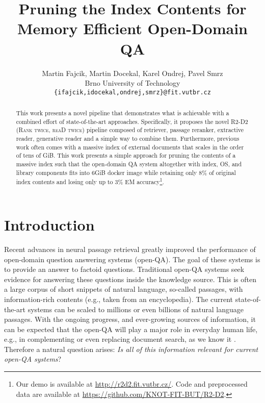 \documentclass[11pt,a4paper]{article}
\title{Pruning the Index Contents for Memory Efficient Open-Domain QA}
\author{Martin Fajcik, Martin Docekal, Karel Ondrej, Pavel Smrz\\
  Brno University of Technology\\
{\tt \{ifajcik,idocekal,ondrej,smrz\}@fit.vutbr.cz} }
\date{}
\begin{document}
\maketitle

\begin{abstract}
This work presents a novel pipeline that demonstrates what is achievable with a combined effort of state-of-the-art approaches. Specifically, it proposes the novel R2-D2 (\textsc{Rank twice}, \textsc{reaD twice}) pipeline composed of retriever, passage reranker, extractive reader, generative reader and a simple way to combine them.
Furthermore, previous work often comes with a massive index of external documents that scales in the order of tens of GiB. 
    This work presents a simple approach for pruning the contents of a massive index such that the open-domain QA system altogether with index, OS, and library components fits into 6GiB docker image while retaining only 8\% of original index contents and losing only up to 3\% EM accuracy\footnote{Our demo is available at \url{http://r2d2.fit.vutbr.cz/}. Code and preprocessed data are available at \url{https://github.com/KNOT-FIT-BUT/R2-D2}.}.
\end{abstract}





\section{Introduction}
Recent advances in neural passage retrieval \cite[\textit{inter alia}]{karpukhin2020dense, izacard2020distilling, khattab2020relevance, luan2020sparse} greatly improved the performance of open-domain question answering systems (open-QA). 
The goal of these systems is to provide an answer to factoid questions. 
Traditional open-QA systems \cite{chen2017reading} seek evidence for answering these questions inside the knowledge source. 
This is often a large corpus of short snippets of natural language, so-called passages, with information-rich contents (e.g., taken from an encyclopedia). 
The current state-of-the-art systems can be scaled to millions or even billions \cite{seo2019real} of natural language passages. With the ongoing progress, and ever-growing sources of information, it can be expected that the open-QA will play a major role in everyday human life, e.g., in complementing or even replacing document search, as we know it \cite{etzioni2011search}. Therefore a natural question arises: \textit{Is all of this information relevant for current open-QA systems}? 
\end{document}
